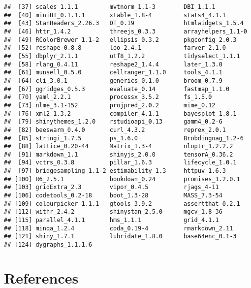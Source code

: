 \documentclass[
  11pt,
  english,
  ,doc,mask,floatsintext]{apa6}
\begin{document}
\begin{verbatim}
##  [37] scales_1.1.1         mvtnorm_1.1-3        DBI_1.1.1           
##  [40] miniUI_0.1.1.1       xtable_1.8-4         stats4_4.1.1        
##  [43] StanHeaders_2.26.3   DT_0.19              htmlwidgets_1.5.4   
##  [46] httr_1.4.2           threejs_0.3.3        arrayhelpers_1.1-0  
##  [49] RColorBrewer_1.1-2   ellipsis_0.3.2       pkgconfig_2.0.3     
##  [52] reshape_0.8.8        loo_2.4.1            farver_2.1.0        
##  [55] dbplyr_2.1.1         utf8_1.2.2           tidyselect_1.1.1    
##  [58] rlang_0.4.11         reshape2_1.4.4       later_1.3.0         
##  [61] munsell_0.5.0        cellranger_1.1.0     tools_4.1.1         
##  [64] cli_3.0.1            generics_0.1.0       broom_0.7.9         
##  [67] ggridges_0.5.3       evaluate_0.14        fastmap_1.1.0       
##  [70] yaml_2.2.1           processx_3.5.2       fs_1.5.0            
##  [73] nlme_3.1-152         projpred_2.0.2       mime_0.12           
##  [76] xml2_1.3.2           compiler_4.1.1       bayesplot_1.8.1     
##  [79] shinythemes_1.2.0    rstudioapi_0.13      gamm4_0.2-6         
##  [82] beeswarm_0.4.0       curl_4.3.2           reprex_2.0.1        
##  [85] stringi_1.7.5        ps_1.6.0             Brobdingnag_1.2-6   
##  [88] lattice_0.20-44      Matrix_1.3-4         nloptr_1.2.2.2      
##  [91] markdown_1.1         shinyjs_2.0.0        tensorA_0.36.2      
##  [94] vctrs_0.3.8          pillar_1.6.3         lifecycle_1.0.1     
##  [97] bridgesampling_1.1-2 estimability_1.3     httpuv_1.6.3        
## [100] R6_2.5.1             bookdown_0.24        promises_1.2.0.1    
## [103] gridExtra_2.3        vipor_0.4.5          rjags_4-11          
## [106] codetools_0.2-18     boot_1.3-28          MASS_7.3-54         
## [109] colourpicker_1.1.1   gtools_3.9.2         assertthat_0.2.1    
## [112] withr_2.4.2          shinystan_2.5.0      mgcv_1.8-36         
## [115] parallel_4.1.1       hms_1.1.1            grid_4.1.1          
## [118] minqa_1.2.4          coda_0.19-4          rmarkdown_2.11      
## [121] shiny_1.7.1          lubridate_1.8.0      base64enc_0.1-3     
## [124] dygraphs_1.1.1.6
\end{verbatim}

\newpage

\hypertarget{references}{%
\section*{References}\label{references}}
\end{document}
